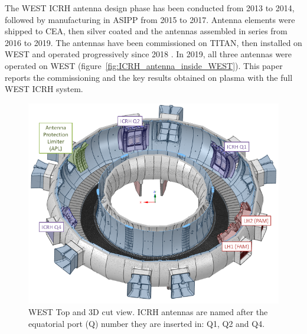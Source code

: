 \documentclass[12p]{iopart}
\begin{document}
The WEST ICRH antenna design phase has been conducted from 2013 to 2014, followed by manufacturing in ASIPP from 2015 to 2017. Antenna elements were shipped to CEA, then silver coated and the antennas assembled in series from 2016 to 2019. The antennas have been commissioned on TITAN\cite{litaudon2013}, then installed on WEST and operated progressively since 2018 \cite{bernard2017, bernard2019, helou2020}. In 2019, all three antennas were operated on WEST (figure~\ref{fig:ICRH_antenna_inside_WEST}). This paper reports the commissioning and the key results obtained on plasma with the full WEST ICRH system.

\begin{figure}
	\centering
	\includegraphics[width=0.95\linewidth]{figures/WEST_overview}
	\caption{WEST Top and 3D cut view. ICRH antennas are named after the equatorial port (Q) number they are inserted in: Q1, Q2 and Q4.}
	\label{fig:westoverview}
\end{figure}
\end{document}
